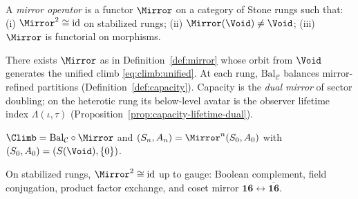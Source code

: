 \begin{definition}\label{def:mirror}
A \emph{mirror operator} is a functor $\Mirror$ on a category of Stone rungs
such that: (i) $\Mirror^2\cong\mathrm{id}$ on stabilized rungs; (ii)
$\Mirror(\Void)\neq\Void$; (iii) $\Mirror$ is functorial on morphisms.
\end{definition}

\begin{axiom}[Mirror]\label{ax:mirror}
There exists $\Mirror$ as in Definition~\ref{def:mirror} whose orbit from
$\Void$ generates the unified climb \eqref{eq:climb:unified}. At each rung,
$\mathrm{Bal}_{\mathcal{C}}$ balances mirror-refined partitions
(Definition~\ref{def:capacity}). Capacity is the \emph{dual mirror} of
sector doubling; on the heterotic rung its below-level avatar is the observer
lifetime index $\Lambda(\iota,\tau)$
(Proposition~\ref{prop:capacity-lifetime-dual}).
\end{axiom}

\begin{definition}\label{def:climb}
$\Climb=\mathrm{Bal}_{\mathcal{C}}\circ\Mirror$ and
$(S_n,A_n)=\Mirror^n(S_0,A_0)$ with $(S_0,A_0)=(S(\Void),\{0\})$.
\end{definition}

\begin{proposition}[Involution]\label{prop:mirror:involution}
On stabilized rungs, $\Mirror^2\cong\mathrm{id}$ up to gauge: Boolean
complement, field conjugation, product factor exchange, and coset mirror
$\mathbf{16}\leftrightarrow\overline{\mathbf{16}}$.
\end{proposition}